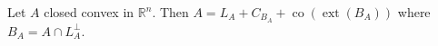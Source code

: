 Let $A$ closed convex in $\mathbb{R}^n$. Then $A=L_A+C_{B_A}+\operatorname{co}(\operatorname{ext}(B_A))$ where $B_A=A\cap L_A^\perp$.
